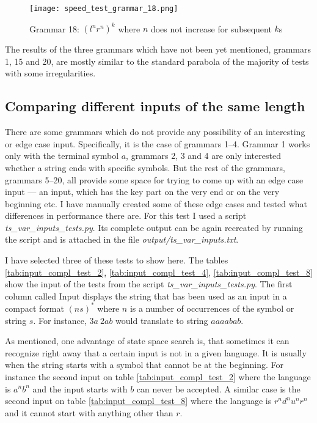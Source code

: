 \begin{figure}[h!]
  \texttt{[image: speed\_test\_grammar\_18.png]}
  \caption{Grammar 18: $(l^n r^n)^k$ where $n$ does not increase for subsequent $k$s}
  \label{fig:speed_test_grammar_18}
\end{figure}

The results of the three grammars which have not been yet mentioned, grammars 1, 15 and 20, are mostly similar to the standard parabola of the majority of tests with some irregularities.

\subsection{Comparing different inputs of the same length}
There are some grammars which do not provide any possibility of an interesting or edge case input. Specifically, it is the case of grammars 1--4. Grammar 1 works only with the terminal symbol $a$, grammars 2, 3 and 4 are only interested whether a string ends with specific symbols. But the rest of the grammars, grammars 5--20, all provide some space for trying to come up with an edge case input --- an input, which has the key part on the very end or on the very beginning etc. I have manually created some of these edge cases and tested what differences in performance there are. For this test I used a script \textit{ts\_var\_inputs\_tests.py}. Its complete output can be again recreated by running the script and is attached in the file \textit{output/ts\_var\_inputs.txt}.

I have selected three of these tests to show here. The tables \ref{tab:input_compl_test_2}, \ref{tab:input_compl_test_4}, \ref{tab:input_compl_test_8}  show the input of the tests from the script \textit{ts\_var\_inputs\_tests.py}. The first column called Input displays the string that has been used as an input in a compact format $(ns)^*$ where $n$ is a number of occurrences of the symbol or string $s$. For instance, $3a\:2ab$ would translate to string $aaaabab$.

As mentioned, one advantage of state space search is, that sometimes it can recognize right away that a certain input is not in a given language. It is usually when the string starts with a symbol that cannot be at the beginning. For instance the second input on table \ref{tab:input_compl_test_2} where the language is $a^nb^n$ and the input starts with $b$ can never be accepted. A similar case is the second input on table \ref{tab:input_compl_test_8} where the language is $r^nd^nu^nr^n$ and it cannot start with anything other than $r$.

